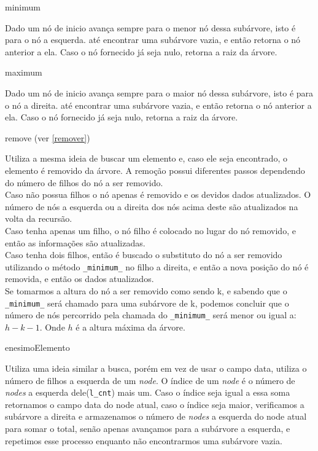 \textsf{minimum}

Dado um nó de inicio avança sempre para o menor nó dessa subárvore, isto é para 
o nó a esquerda. até encontrar uma subárvore vazia, e então retorna o nó 
anterior a ela. Caso o nó fornecido já seja nulo, retorna a raiz da árvore.

\textsf{maximum}

Dado um nó de inicio avança sempre para o maior nó dessa subárvore, isto é para 
o nó a direita. até encontrar uma subárvore vazia, e então retorna o nó 
anterior a ela. Caso o nó fornecido já seja nulo, retorna a raiz da árvore.

\textsf{remove} (ver \autoref{remover})

Utiliza a mesma ideia de buscar um elemento e, caso ele seja encontrado, o 
elemento é removido da árvore. A remoção possui diferentes passos dependendo do 
número de filhos do nó a ser removido.\\
Caso não possua filhos o nó apenas é removido e os devidos dados atualizados.
O número de nós a esquerda ou a direita dos nós acima deste são atualizados na 
volta da recursão.\\
Caso tenha apenas um filho, o nó filho é colocado no lugar do nó removido, e 
então as informações são atualizadas.\\
Caso tenha dois filhos, então é buscado o substituto do nó a ser removido 
utilizando o método \texttt{\_minimum\_} no filho a direita, e então a nova 
posição do nó é removida, e então os dados atualizados.\\
Se tomarmos a altura do nó a ser removido como sendo \textsf{k}, e sabendo que 
o \texttt{\_minimum\_} será chamado para uma subárvore de \textsf{k}, podemos 
concluir que o número de nós percorrido pela chamada do \texttt{\_minimum\_} 
será menor ou igual a: $ h - k - 1 $. Onde $ h $ é a altura máxima da árvore.

\textsf{enesimoElemento}

Utiliza uma ideia similar a busca, porém em vez de usar o campo data, utiliza o 
número de filhos a esquerda de um \emph{node}. O índice de um \emph{node} é o 
número de \emph{nodes} a esquerda dele(\texttt{l\_cnt}) mais um. Caso o índice 
seja igual a essa soma retornamos o campo data do node atual, caso o índice seja 
maior, verificamos a subárvore a direita e armazenamos o número de \emph{nodes} 
a esquerda do node atual para somar o total, senão apenas avançamos para a 
subárvore a esquerda, e repetimos esse processo enquanto não encontrarmos uma 
subárvore vazia.

